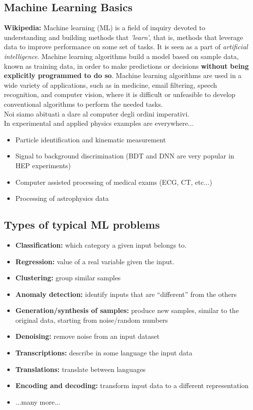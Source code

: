 \subsection{Machine Learning Basics}
\textbf{Wikipedia:} Machine learning (ML) is a field of inquiry devoted to understanding and building methods that \textit{'learn'}, that is, methods that leverage data to improve performance on some set of tasks. It is seen as a part of \textit{artificial intelligence}. Machine learning algorithms build a model based on sample data, known as training data, in order to make predictions or decisions \textbf{without being explicitly programmed to do so}. Machine learning algorithms are used in a wide variety of applications, such as in medicine, email filtering, speech recognition, and computer vision, where it is difficult or unfeasible to develop conventional algorithms to perform the needed tasks.\\

Noi siamo abituati a dare al computer degli ordini imperativi.\\

In experimental and applied physics examples are everywhere...
\begin{itemize}
	\item Particle identification and kinematic measurement
	\item Signal to background discrimination (BDT and DNN are very popular in HEP experiments)
	\item Computer assisted processing of medical exams (ECG, CT, etc...)
	\item Processing of astrophysics data
\end{itemize}

\subsection{Types of typical ML problems}


\begin{itemize}
	\item \textbf{Classification:} which category a given input belongs to. 
	\item \textbf{Regression:} value of a real variable given the input.
	\item \textbf{Clustering:} group similar samples
	\item \textbf{Anomaly detection:} identify inputs that are “different” from the others
	\item \textbf{Generation/synthesis of samples:} produce new samples, similar to the original data, starting from noise/random numbers
	\item \textbf{Denoising:} remove noise from an input dataset
	\item \textbf{Transcriptions:} describe in some language the input data
	\item \textbf{Translations:} translate between languages
	\item \textbf{Encoding and decoding:} transform input data to a different representation
	\item ...many more...
\end{itemize}


